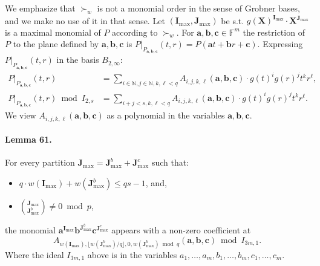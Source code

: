 \documentclass[10pt,a4paper]{article}
\begin{document}
We emphasize that $\succ_w$ is not a monomial order in the sense of Grobner bases, and we make no use of it in that sense.
Let $(\boldsymbol I_{\max},\boldsymbol J_{\max})$ be s.t. $g(\boldsymbol X)^{\boldsymbol I_{\max}}\cdot\boldsymbol X^{\boldsymbol J_{\max}}$ is a maximal monomial of $P$ according to $\succ_w$.
For $\boldsymbol a,\boldsymbol b,\boldsymbol c\in\mathbb F^m$ the restriction of $P$ to the plane defined by $\boldsymbol a,\boldsymbol b,\boldsymbol c$ is $P|_{P_{\boldsymbol a,\boldsymbol b,\boldsymbol c}}(t,r)=P(\boldsymbol at+\boldsymbol br+\boldsymbol c)$. Expressing $P|_{P_{\boldsymbol a,\boldsymbol b,\boldsymbol c}}(t,r)$ in the basis $B_{2,\infty}$:
\begin{align*}
P|_{P_{\boldsymbol a,\boldsymbol b,\boldsymbol c}}(t,r)&=\sum_{i\in\mathbb N,j\in\mathbb N,k,\ell<q}A_{i,j,k,\ell}(\boldsymbol a,\boldsymbol b,\boldsymbol c)\cdot g(t)^ig(r)^jt^kr^\ell,\\
P|_{P_{\boldsymbol a,\boldsymbol b,\boldsymbol c}}(t,r)\bmod I_{2,s}&=\sum_{i+j<s,k,\ell<q}A_{i,j,k,\ell}(\boldsymbol a,\boldsymbol b,\boldsymbol c)\cdot g(t)^ig(r)^jt^kr^\ell.
\end{align*}
We view $A_{i,j,k,\ell}(\boldsymbol a,\boldsymbol b,\boldsymbol c)$ as a polynomial in the variables $\boldsymbol a,\boldsymbol b,\boldsymbol c$.
\paragraph{Lemma 61.} For every partition $\boldsymbol J_{\max}=\boldsymbol J_{\max}^b+\boldsymbol J_{\max}^c$ such that:
\begin{itemize}
\item $q\cdot w(\boldsymbol I_{\max})+w(\boldsymbol J_{\max}^b)\leq qs-1$, and,
\item $\binom{\boldsymbol J_{\max}}{\boldsymbol J_{\max}^b}\neq0\bmod p$,
\end{itemize}
the monomial $\boldsymbol a^{\boldsymbol I_{\max}}\boldsymbol b^{\boldsymbol J_{\max}^b}\boldsymbol c^{\boldsymbol J_{\max}^c}$ appears with a non-zero coefficient at
\[A_{w(\boldsymbol I_{\max}),\lfloor w(\boldsymbol J_{\max}^b)/q\rfloor,0,w(\boldsymbol J_{\max}^b)\bmod q}(\boldsymbol a,\boldsymbol b,\boldsymbol c)\bmod I_{3m,1}.\]
Where the ideal $I_{3m,1}$ above is in the variables $a_1,\ldots,a_m,b_1,\ldots,b_m,c_1,\ldots,c_m$.
\end{document}
